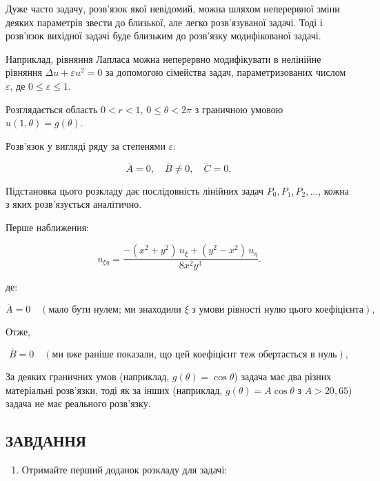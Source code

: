 \documentclass[
  ukrainian,
]{article}
\providecommand{\tightlist}{%
  \setlength{\itemsep}{0pt}\setlength{\parskip}{0pt}}
\begin{document}
Дуже часто задачу, розв'язок якої невідомий, можна шляхом неперервної
зміни деяких параметрів звести до близької, але легко розв'язуваної
задачі. Тоді і розв'язок вихідної задачі буде близьким до розв'язку
модифікованої задачі.

Наприклад, рівняння Лапласа можна неперервно модифікувати в нелінійне
рівняння \(\Delta u + \varepsilon u^2 = 0\) за допомогою сімейства
задач, параметризованих числом \(\varepsilon\), де
\(0 \le \varepsilon \le 1\).

Розглядається область \(0 < r < 1\), \(0 \le \theta < 2\pi\) з граничною
умовою \(u(1,\theta) = g(\theta)\).

Розв'язок у вигляді ряду за степенями \(\varepsilon\):

\[
\overline{A} = 0, \quad \overline{B} \neq 0, \quad \overline{C} = 0,
\]

Підстановка цього розкладу дає послідовність лінійних задач
\(P_0, P_1, P_2, \ldots\), кожна з яких розв'язується аналітично.

Перше наближення:

\[
u_{\xi\eta} = \frac{-(x^2+y^2)\,u_\xi + (y^2-x^2)\,u_\eta}{8x^2 y^3}.
\]

де:

\[
\overline{A} = 0 \quad (\text{мало бути нулем; ми знаходили } \xi \text{ з умови рівності нулю цього коефіцієнта}),
\]

Отже,

\[
\overline{B} = 0 \quad (\text{ми вже раніше показали, що цей коефіцієнт теж обертається в нуль}),
\]

За деяких граничних умов (наприклад, \(g(\theta) = \cos\theta\)) задача
має два різних матеріальні розв'язки, тоді як за інших (наприклад,
\(g(\theta) = A\cos\theta\) з \(A > 20{,}65\)) задача не має реального
розв'язку.

\subsection{ЗАВДАННЯ}\label{ux437ux430ux432ux434ux430ux43dux43dux44f-20}

\begin{enumerate}
\def\labelenumi{\arabic{enumi}.}
\tightlist
\item
  Отримайте перший доданок розкладу для задачі:
\end{enumerate}
\end{document}
